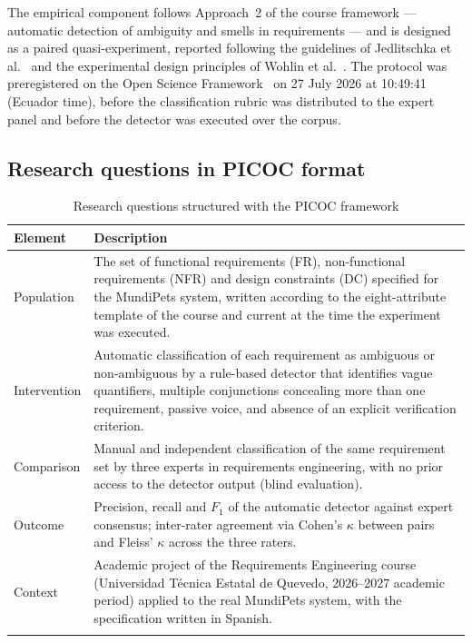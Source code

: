 \documentclass[pdflatex,sn-mathphys-num]{sn-jnl}
\theoremstyle{thmstyleone}%
\theoremstyle{thmstyletwo}%
\theoremstyle{thmstylethree}%
\begin{document}
The empirical component follows Approach~2 of the course framework ---
automatic detection of ambiguity and smells in requirements --- and is designed
as a paired quasi-experiment, reported following the guidelines of Jedlitschka
et al.~\cite{jedlitschka2008} and the experimental design principles of Wohlin
et al.~\cite{wohlin2012}. The protocol was preregistered on the Open Science
Framework~\cite{nosek2018} on 27 July 2026 at 10:49:41 (Ecuador time), before
the classification rubric was distributed to the expert panel and before the
detector was executed over the corpus.

\subsection{Research questions in PICOC format}\label{subsec:picoc}

\begin{table}[h]
\caption{Research questions structured with the PICOC framework}\label{tab:picoc}
\begin{tabular}{@{}p{2.0cm}p{9.5cm}@{}}
\toprule
Element & Description \\
\midrule
Population & The set of functional requirements (FR), non-functional
requirements (NFR) and design constraints (DC) specified for the MundiPets
system, written according to the eight-attribute template of the course and
current at the time the experiment was executed. \\
Intervention & Automatic classification of each requirement as ambiguous or
non-ambiguous by a rule-based detector that identifies vague quantifiers,
multiple conjunctions concealing more than one requirement, passive voice, and
absence of an explicit verification criterion. \\
Comparison & Manual and independent classification of the same requirement set
by three experts in requirements engineering, with no prior access to the
detector output (blind evaluation). \\
Outcome & Precision, recall and $F_1$ of the automatic detector against expert
consensus; inter-rater agreement via Cohen's $\kappa$ between pairs and Fleiss'
$\kappa$ across the three raters. \\
Context & Academic project of the Requirements Engineering course (Universidad
Técnica Estatal de Quevedo, 2026--2027 academic period) applied to the real
MundiPets system, with the specification written in Spanish. \\
\botrule
\end{tabular}
\end{table}
\end{document}
